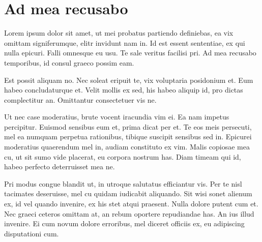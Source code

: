 \chapter{Ad mea recusabo}

Lorem ipsum dolor sit amet, ut mei probatus partiendo definiebas, ea vix omittam signiferumque, elitr invidunt nam in. Id est essent sententiae, ex qui nulla epicuri. Falli omnesque eu usu. Te sale veritus facilisi pri. Ad mea recusabo temporibus, id consul graeco possim eam.

Est possit aliquam no. Nec soleat eripuit te, vix voluptaria posidonium et. Eum habeo concludaturque et. Velit mollis ex sed, his habeo aliquip id, pro dictas complectitur an. Omittantur consectetuer vis ne.

Ut nec case moderatius, brute vocent iracundia vim ei. Ea nam impetus percipitur. Euismod sensibus eum et, prima dicat per et. Te eos meis persecuti, mel ea numquam perpetua rationibus, tibique suscipit sensibus sed in. Epicurei moderatius quaerendum mel in, audiam constituto ex vim. Malis copiosae mea cu, ut sit sumo vide placerat, eu corpora nostrum has. Diam timeam qui id, habeo perfecto deterruisset mea ne.

Pri modus congue blandit ut, in utroque salutatus efficiantur vis. Per te nisl tacimates deseruisse, mel cu quidam iudicabit aliquando. Sit wisi sonet alienum ex, id vel quando invenire, ex his stet atqui praesent. Nulla dolore putent cum et. Nec graeci ceteros omittam at, an rebum oportere repudiandae has. An ius illud invenire. Ei cum novum dolore erroribus, mel diceret officiis ex, eu adipiscing disputationi cum.
